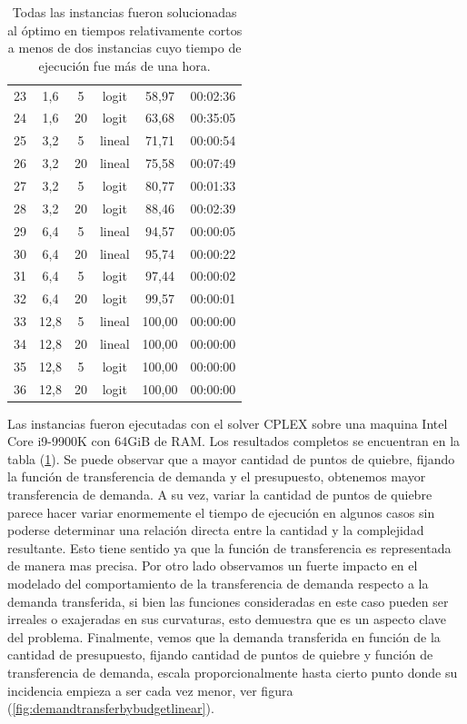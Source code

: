 \documentclass{article}
\begin{document}
\begin{table}
\begin{tabular}{cccccc}
        23 & 1,6 & 5 & logit & 58,97 & 00:02:36 \\
        24 & 1,6 & 20 & logit & 63,68 & 00:35:05 \\
        25 & 3,2 & 5 & lineal & 71,71 & 00:00:54 \\
        26 & 3,2 & 20 & lineal & 75,58 & 00:07:49 \\
        27 & 3,2 & 5 & logit & 80,77 & 00:01:33 \\
        28 & 3,2 & 20 & logit & 88,46 & 00:02:39 \\
        29 & 6,4 & 5 & lineal & 94,57 & 00:00:05 \\
        30 & 6,4 & 20 & lineal & 95,74 & 00:00:22 \\
        31 & 6,4 & 5 & logit & 97,44 & 00:00:02 \\
        32 & 6,4 & 20 & logit & 99,57 & 00:00:01 \\
        33 & 12,8 & 5 & lineal & 100,00 & 00:00:00 \\
        34 & 12,8 & 20 & lineal & 100,00 & 00:00:00 \\
        35 & 12,8 & 5 & logit & 100,00 & 00:00:00 \\
        36 & 12,8 & 20 & logit & 100,00 & 00:00:00 \\
        \bottomrule
    \end{tabular}
      \caption{Todas las instancias fueron solucionadas al óptimo en tiempos relativamente cortos a menos de dos instancias cuyo tiempo de ejecución fue más de una hora.} \label{table:sensibilityresults}
  \end{table}

  Las instancias fueron ejecutadas con el solver CPLEX sobre una maquina Intel Core i9-9900K con 64GiB de RAM. Los resultados completos se encuentran en la tabla (\ref{table:sensibilityresults}). Se puede observar que a mayor cantidad de puntos de quiebre, fijando la función de transferencia de demanda y el presupuesto, obtenemos mayor transferencia de demanda. A su vez, variar la cantidad de puntos de quiebre parece hacer variar enormemente el tiempo de ejecución en algunos casos sin poderse determinar una relación directa entre la cantidad y la complejidad resultante. Esto tiene sentido ya que la función de transferencia es representada de manera mas precisa. Por otro lado observamos un fuerte impacto en el modelado del comportamiento de la transferencia de demanda respecto a la demanda transferida, si bien las funciones consideradas en este caso pueden ser irreales o exajeradas en sus curvaturas, esto demuestra que es un aspecto clave del problema. Finalmente, vemos que la demanda transferida en función de la cantidad de presupuesto, fijando cantidad de puntos de quiebre y función de transferencia de demanda, escala proporcionalmente hasta cierto punto donde su incidencia empieza a ser cada vez menor, ver figura (\ref{fig:demandtransferbybudgetlinear}).
\end{document}
